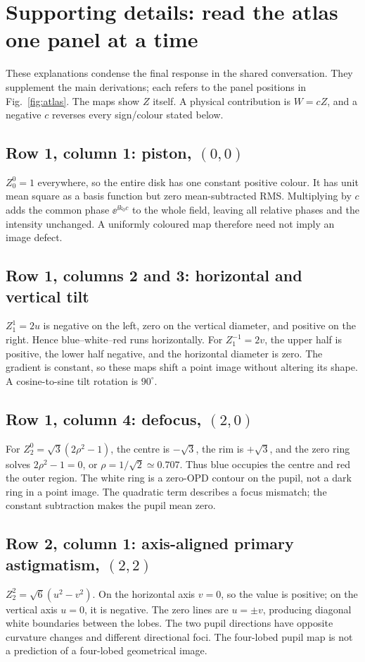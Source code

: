 \appendix
\section{Supporting details: read the atlas one panel at a time}
These explanations condense the final response in the shared conversation. They supplement the main derivations; each refers to the panel positions in Fig.~\ref{fig:atlas}. The maps show $Z$ itself. A physical contribution is $W=cZ$, and a negative $c$ reverses every sign/colour stated below.

\subsection*{Row 1, column 1: piston, $(0,0)$}
$Z_0^0=1$ everywhere, so the entire disk has one constant positive colour. It has unit mean square as a basis function but zero mean-subtracted RMS. Multiplying by $c$ adds the common phase $\ee^{\ii k_0c}$ to the whole field, leaving all relative phases and the intensity unchanged. A uniformly coloured map therefore need not imply an image defect.

\subsection*{Row 1, columns 2 and 3: horizontal and vertical tilt}
$Z_1^1=2u$ is negative on the left, zero on the vertical diameter, and positive on the right. Hence blue--white--red runs horizontally. For $Z_1^{-1}=2v$, the upper half is positive, the lower half negative, and the horizontal diameter is zero. The gradient is constant, so these maps shift a point image without altering its shape. A cosine-to-sine tilt rotation is $90^\circ$.

\subsection*{Row 1, column 4: defocus, $(2,0)$}
For $Z_2^0=\sqrt3(2\rho^2-1)$, the centre is $-\sqrt3$, the rim is $+\sqrt3$, and the zero ring solves $2\rho^2-1=0$, or $\rho=1/\sqrt2\simeq0.707$. Thus blue occupies the centre and red the outer region. The white ring is a zero-OPD contour on the pupil, not a dark ring in a point image. The quadratic term describes a focus mismatch; the constant subtraction makes the pupil mean zero.

\subsection*{Row 2, column 1: axis-aligned primary astigmatism, $(2,2)$}
$Z_2^2=\sqrt6(u^2-v^2)$. On the horizontal axis $v=0$, so the value is positive; on the vertical axis $u=0$, it is negative. The zero lines are $u=\pm v$, producing diagonal white boundaries between the lobes. The two pupil directions have opposite curvature changes and different directional foci. The four-lobed pupil map is not a prediction of a four-lobed geometrical image.

